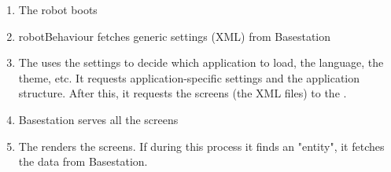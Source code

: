 \begin{enumerate}
    \item The robot boots
    \item robotBehaviour fetches generic settings (\ac{XML}) from Basestation
    \item The \cm uses the settings to decide which application to load, the language, the theme, etc. It requests application-specific settings and the application structure. After this, it requests the screens (the \ac{XML} files) to the \flangobe .
    \item Basestation serves all the screens
    \item The \cm renders the screens. If during this process it finds an "entity", it fetches the data from Basestation.
\end{enumerate}

\FloatBarrier

